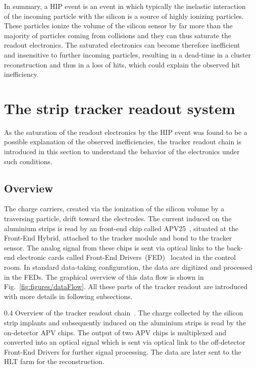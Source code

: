 In summary, a HIP event is an event in which typically the inelastic interaction of the incoming particle with the silicon is a source of highly ionizing particles. These particles ionize the volume of the silicon sensor by far more than the majority of particles coming from collisions and they can thus saturate the readout electronics. The saturated electronics can become therefore inefficient and insensitive to further incoming particles, resulting in a dead-time in a cluster reconstruction and thus in a loss of hits, which could explain the observed hit inefficiency.


\section{The strip tracker readout system}

As the saturation of the readout electronics by the HIP event was found to be a possible explanation of the observed inefficiencies, the tracker readout chain is introduced in this section to understand the behavior of the electronics under such conditions.


\subsection{Overview}


The charge carriers, created via the ionization of the silicon volume by a traversing particle, drift toward the electrodes. The current induced on the aluminium strips is read by an front-end chip called APV25~\cite{French:2001xb, Jones:1999vi}, situated at the Front-End Hybrid, attached to the tracker module and bond to the tracker sensor. The analog signal from these chips is sent via optical links to the back-end electronic cards called Front-End Drivers~(FED)~\cite{Baird:2002wg} located in the control room. In standard data-taking configuration, the data are digitized and processed in the FEDs. The graphical overview of this data flow is shown in Fig.~\ref{fig:figures/dataFlow}. All these parts of the tracker readout are introduced with more details in following subsections.

                 {0.4}       %
                 {Overview of the tracker readout chain~\cite{Bainbridge:2004jc}. The charge collected by the silicon strip implants and subsequently induced on the aluminium strips is read by the on-detector APV chips. The output of two APV chips is multiplexed and converted into an optical signal which is sent via optical link to the off-detector Front-End Drivers for further signal processing. The data are later sent to the HLT farm for the reconstruction. } %

